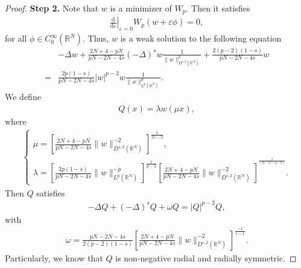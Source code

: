 \documentclass[12pt,a4paper,reqno]{amsart}
\numberwithin{equation}{section}
\begin{document}
\begin{proof}
{\bf Step 2.} Note that $w$ is a minimizer of $W_{p}$. Then it satisfies
\begin{equation*}
\begin{aligned}
\left.\frac{\mathrm{d}}{\mathrm{d}\varepsilon}\right|_{\varepsilon=0}W_{p}(w+\varepsilon \phi)=0,
\end{aligned}
\end{equation*}
for all $\phi\in C^{\infty}_{0}(\mathbb{R}^{N})$. Thus, $w$ is a weak solution to the following equation
\begin{equation*}
\begin{aligned}
&-\Delta w
+\frac{2N+4-pN}{pN-2N-4s}
(-\Delta)^{s}w
\frac{1}{\|w\|_{D^{s,2}(\mathbb{R}^{N})}^{2}}
+\frac{2(p-2)(1-s)}{pN-2N-4s}w\\
=&\frac{2p(1-s)}{pN-2N-4s}|w|^{p-2}w
\frac{1}
{\|w\|_{L^{p}(\mathbb{R}^{N})}^{p}}.
\end{aligned}
\end{equation*}
We define
\begin{equation}\label{4.9}
\begin{aligned}
Q(x)=\lambda w(\mu x),
\end{aligned}
\end{equation}
where
\begin{equation*}
\begin{aligned}
\begin{cases}
\mu=\left[\frac{2N+4-pN}{pN-2N-4s}
\|w\|_{D^{s,2}(\mathbb{R}^{N})}^{-2}
\right]^{\frac{1}{2s-2}},\\
\lambda
=
\left[\frac{2p(1-s)}{pN-2N-4s}
\|w\|_{L^{p}(\mathbb{R}^{N})}^{-p}\right]^{\frac{1}{p-2}}
\left[\frac{2N+4-pN}{pN-2N-4s}
\|w\|_{D^{s,2}(\mathbb{R}^{N})}^{-2}
\right]^{^{\frac{2}{(2s-2)(p-2)}}}.
\end{cases}
\end{aligned}
\end{equation*}
Then $Q$ satisfies
\begin{equation*}
\begin{aligned}
-\Delta Q
+
(-\Delta)^{s}Q
+\omega Q
=|Q|^{p-2}Q,
\end{aligned}
\end{equation*}
with
\begin{equation*}
\begin{aligned}
\omega
=\frac{pN-2N-4s}{2(p-2)(1-s)}
\left[
\frac{2N+4-pN}{pN-2N-4s}
\|w\|_{D^{s,2}(\mathbb{R}^{N})}^{-2}
\right]^{\frac{-1}{s-1}}.
\end{aligned}
\end{equation*}
Particularly, we know that $Q$ is non-negative radial and radially symmetric.
\end{proof}
\end{document}
